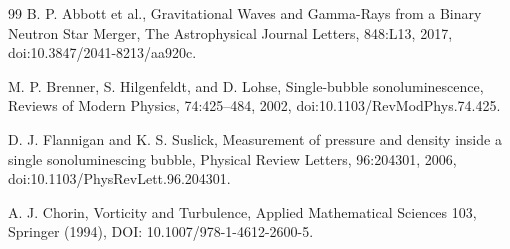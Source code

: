 \begin{thebibliography}{99}
     B. P. Abbott et al., Gravitational Waves and Gamma-Rays from a Binary Neutron Star Merger, The Astrophysical Journal Letters, 848:L13, 2017, doi:10.3847/2041-8213/aa920c.

     M. P. Brenner, S. Hilgenfeldt, and D. Lohse, Single-bubble sonoluminescence, Reviews of Modern Physics, 74:425--484, 2002, doi:10.1103/RevModPhys.74.425.

     D. J. Flannigan and K. S. Suslick, Measurement of pressure and density inside a single sonoluminescing bubble, Physical Review Letters, 96:204301, 2006, doi:10.1103/PhysRevLett.96.204301.


     A. J. Chorin, Vorticity and Turbulence, Applied Mathematical Sciences 103, Springer (1994), DOI: 10.1007/978-1-4612-2600-5.


\end{thebibliography}